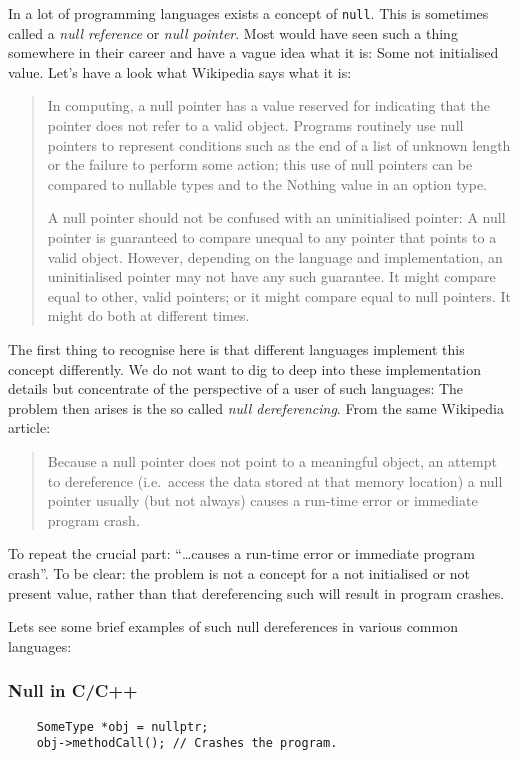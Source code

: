 \documentclass[12pt,a4paper]{report}
\begin{document}
In a lot of programming languages exists a concept of \texttt{null}. This is sometimes called a \textit{null reference} or \textit{null pointer}. Most would have seen such a thing somewhere in their career and have a vague idea what it is: Some not initialised value. Let's have a look what Wikipedia\cite{null-wiki} says what it is:

\begin{quotation}
    In computing, a null pointer has a value reserved for indicating that the pointer does not refer to a valid object. Programs routinely use null pointers to represent conditions such as the end of a list of unknown length or the failure to perform some action; this use of null pointers can be compared to nullable types and to the Nothing value in an option type.

    A null pointer should not be confused with an uninitialised pointer: A null pointer is guaranteed to compare unequal to any pointer that points to a valid object. However, depending on the language and implementation, an uninitialised pointer may not have any such guarantee. It might compare equal to other, valid pointers; or it might compare equal to null pointers. It might do both at different times.
\end{quotation}

The first thing to recognise here is that different languages implement this concept differently. We do not want to dig to deep into these implementation details but concentrate of the perspective of a user of such languages: The problem then arises is the so called \textit{null dereferencing}. From the same Wikipedia\cite{null-wiki} article:

\begin{quotation}
    Because a null pointer does not point to a meaningful object, an attempt to dereference (i.e.\ access the data stored at that memory location) a null pointer usually (but not always) causes a run-time error or immediate program crash.
\end{quotation}

To repeat the crucial part: ``\ldots causes a run-time error or immediate program crash''. To be clear: the problem is not a concept for a not initialised or not present value, rather than that dereferencing such will result in program crashes.

Lets see some brief examples of such null dereferences in various common languages:

\subsubsection{Null in C/C++}
\begin{verbatim}
    SomeType *obj = nullptr;
    obj->methodCall(); // Crashes the program.
\end{verbatim}
\end{document}
